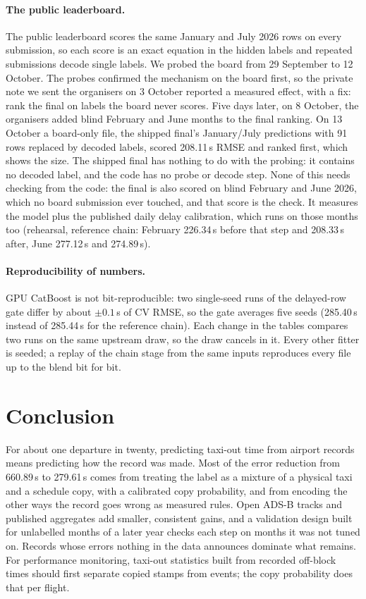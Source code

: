 \documentclass[
  manuscript=article,
  layout=preprint,
  year=2026,
  volume=x,
]{extra/joas}
\begin{document}
\paragraph{The public leaderboard.} The public leaderboard scores the same January and July 2026 rows on every submission, so
each score is an exact equation in the hidden labels and repeated submissions decode single labels. We probed the board from
29 September to 12 October. The probes confirmed the mechanism on the board first, so the private note we sent the organisers on
3 October reported a measured effect, with a fix: rank the final on labels the board never scores. Five days later, on 8 October, the
organisers added blind February and June months to the final ranking. On 13 October a board-only file, the shipped final's
January/July predictions with 91 rows replaced by decoded labels, scored 208.11\,s RMSE and ranked first, which shows the size.
The shipped final has nothing to do with the probing: it contains no decoded label, and the code has no probe or decode step.
None of this needs checking from the code: the final is also scored on blind February and June 2026, which no board submission
ever touched, and that score is the check. It measures the model plus the published daily delay calibration, which runs on those
months too (rehearsal, reference chain: February 226.34\,s before that step and 208.33\,s after, June 277.12\,s and 274.89\,s).

\paragraph{Reproducibility of numbers.} GPU CatBoost is not bit-reproducible: two single-seed runs of the delayed-row gate differ by about
$\pm 0.1$\,s of CV RMSE, so the gate averages five seeds (285.40\,s instead of 285.44\,s for the reference chain). Each change in the
tables compares two runs on the same upstream draw, so the draw cancels in it. Every other fitter is seeded; a replay of the chain stage
from the same inputs reproduces every file up to the blend bit for bit.


\section{Conclusion}
\label{sec:conclusion}

For about one departure in twenty, predicting taxi-out time from airport records means predicting how the record was made. Most of
the error reduction from 660.89\,s to 279.61\,s comes from treating the label as a mixture of a physical taxi and a schedule copy,
with a calibrated copy probability, and from encoding the other ways the record goes wrong as measured rules. Open ADS-B tracks and
published aggregates add smaller, consistent gains, and a validation design built for unlabelled months of a later year checks each
step on months it was not tuned on. Records whose errors nothing in the data announces dominate what remains. For performance
monitoring, taxi-out statistics built from recorded off-block times should first separate copied stamps from events; the copy
probability does that per flight.
\end{document}
